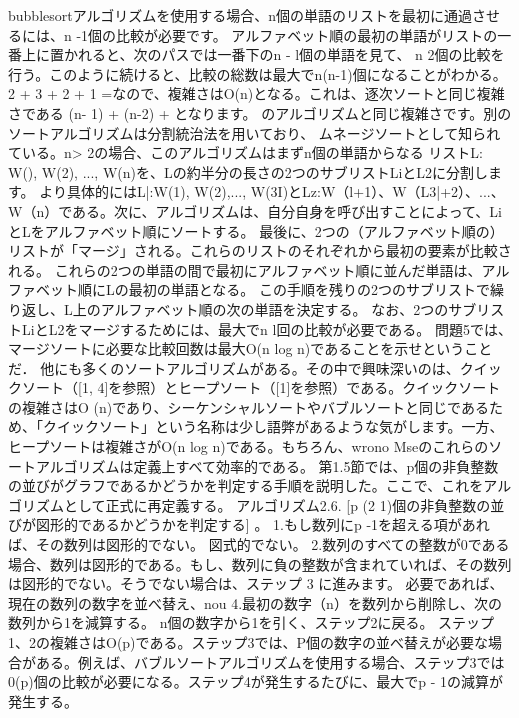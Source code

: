 
bubblesortアルゴリズムを使用する場合、n個の単語のリストを最初に通過させるには、n -1個の比較が必要です。
アルファベット順の最初の単語がリストの一番上に置かれると、次のパスでは一番下のn - l個の単語を見て、
n 2個の比較を行う。このように続けると、比較の総数は最大でn(n-1)個になることがわかる。
2 + 3 + 2 + 1 =なので、複雑さはO(n)となる。これは、逐次ソートと同じ複雑さである
(n- 1) + (n-2) + となります。
のアルゴリズムと同じ複雑さです。別のソートアルゴリズムは分割統治法を用いており、
ムネージソートとして知られている。n> 2の場合、このアルゴリズムはまずn個の単語からなる
リストL: W(), W(2), ..., W(n)を、Lの約半分の長さの2つのサブリストLiとL2に分割します。 
より具体的にはL|:W(1), W(2),..., W(3I)とLz:W（l+1）、W（L3|+2）、...、W（n）である。次に、アルゴリズムは、自分自身を呼び出すことによって、LiとLをアルファベット順にソートする。
最後に、2つの（アルファベット順の）リストが「マージ」される。これらのリストのそれぞれから最初の要素が比較される。
これらの2つの単語の間で最初にアルファベット順に並んだ単語は、アルファベット順にLの最初の単語となる。
この手順を残りの2つのサブリストで繰り返し、L上のアルファベット順の次の単語を決定する。
なお、2つのサブリストLiとL2をマージするためには、最大でn l回の比較が必要である。
問題5では、マージソートに必要な比較回数は最大O(n log n)であることを示せということだ．
他にも多くのソートアルゴリズムがある。その中で興味深いのは、クイックソート（[1, 4]を参照）とヒープソート（[1]を参照）である。クイックソートの複雑さはO (n)であり、シーケンシャルソートやバブルソートと同じであるため、「クイックソート」という名称は少し語弊があるような気がします。一方、ヒープソートは複雑さがO(n log n)である。もちろん、wrono Mseのこれらのソートアルゴリズムは定義上すべて効率的である。
第1.5節では、p個の非負整数の並びがグラフであるかどうかを判定する手順を説明した。ここで、これをアルゴリズムとして正式に再定義する。
アルゴリズム2.6.
[p (2 1)個の非負整数の並びが図形的であるかどうかを判定する] 。
1.もし数列にp -1を超える項があれば、その数列は図形的でない。
図式的でない。
2.数列のすべての整数が0である場合、数列は図形的である。もし、数列に負の整数が含まれていれば、その数列は図形的でない。そうでない場合は、ステップ 3 に進みます。
必要であれば、現在の数列の数字を並べ替え、nou 4.最初の数字（n）を数列から削除し、次の数列から1を減算する。
n個の数字から1を引く、ステップ2に戻る。
ステップ1、2の複雑さはO(p)である。ステップ3では、P個の数字の並べ替えが必要な場合がある。例えば、バブルソートアルゴリズムを使用する場合、ステップ3では0(p)個の比較が必要になる。ステップ4が発生するたびに、最大でp - 1の減算が発生する。